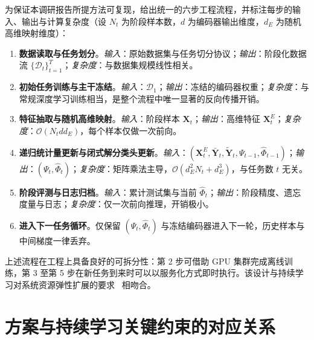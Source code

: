 为保证本调研报告所提方法可复现，给出统一的六步工程流程，并标注每步的输入、输出与计算复杂度（设 $N_t$ 为阶段样本数，$d$ 为编码器输出维度，$d_E$ 为随机高维映射维度）：
\begin{enumerate}
    \item \textbf{数据读取与任务划分}。\textit{输入}：原始数据集与任务切分协议；\textit{输出}：阶段化数据流 $\{\mathcal{D}_t\}_{t=1}^{T}$；\textit{复杂度}：与数据集规模线性相关。
    \item \textbf{初始任务训练与主干冻结}。\textit{输入}：$\mathcal{D}_1$；\textit{输出}：冻结的编码器权重；\textit{复杂度}：与常规深度学习训练相当，是整个流程中唯一显著的反向传播开销。
    \item \textbf{特征抽取与随机高维映射}。\textit{输入}：阶段样本 $\mathbf{X}_t$；\textit{输出}：高维特征 $\mathbf{X}_t^{E}$；\textit{复杂度}：$\mathcal{O}(N_t d d_E)$，每个样本仅做一次前向。
    \item \textbf{递归统计量更新与闭式解分类头更新}。\textit{输入}：$(\mathbf{X}_t^{E},\bar{\mathbf{Y}}_t,\tilde{\mathbf{Y}}_t,\Psi_{t-1},\widehat{\Phi}_{t-1})$；\textit{输出}：$(\Psi_t,\widehat{\Phi}_t)$；\textit{复杂度}：矩阵乘法主导，$\mathcal{O}(d_E^2 N_t + d_E^3)$，与任务数 $t$ 无关。
    \item \textbf{阶段评测与日志归档}。\textit{输入}：累计测试集与当前 $\widehat{\Phi}_t$；\textit{输出}：阶段精度、遗忘度量与日志；\textit{复杂度}：仅一次前向推理，开销极小。
    \item \textbf{进入下一任务循环}。仅保留 $(\Psi_t,\widehat{\Phi}_t)$ 与冻结编码器进入下一轮，历史样本与中间梯度一律丢弃。
\end{enumerate}

上述流程在工程上具备良好的可拆分性：第 2 步可借助 GPU 集群完成离线训练，第 3 至第 5 步在新任务到来时可以以服务化方式即时执行。该设计与持续学习对系统资源弹性扩展的要求~\citep{wang2024survey} 相吻合。

\section{方案与持续学习关键约束的对应关系}

